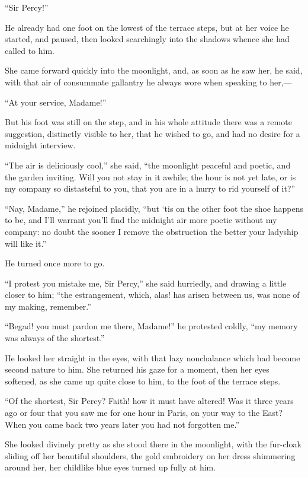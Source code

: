 \enquote{Sir Percy!}

He already had one foot on the lowest of the terrace steps, but at her voice he started, and paused, then looked searchingly into the shadows whence she had called to him.

She came forward quickly into the moonlight, and, as soon as he saw her, he said, with that air of consummate gallantry he always wore when speaking to her,---

\enquote{At your service, Madame!}

But his foot was still on the step, and in his whole attitude there was a remote suggestion, distinctly visible to her, that he wished to go, and had no desire for a midnight interview.

\enquote{The air is deliciously cool,} she said, \enquote{the moonlight peaceful and poetic, and the garden inviting. Will you not stay in it awhile; the hour is not yet late, or is my company so distasteful to you, that you are in a hurry to rid yourself of it?}

\enquote{Nay, Madame,} he rejoined placidly, \enquote{but `tis on the other foot the shoe happens to be, and I'll warrant you'll find the midnight air more poetic without my company: no doubt the sooner I remove the obstruction the better your ladyship will like it.}

He turned once more to go.

\enquote{I protest you mistake me, Sir Percy,} she said hurriedly, and drawing a little closer to him; \enquote{the estrangement, which, alas! has arisen between us, was none of my making, remember.}

\enquote{Begad! you must pardon me there, Madame!} he protested coldly, \enquote{my memory was always of the shortest.}

He looked her straight in the eyes, with that lazy nonchalance which had become second nature to him. She returned his gaze for a moment, then her eyes softened, as she came up quite close to him, to the foot of the terrace steps.

\enquote{Of the shortest, Sir Percy? Faith! how it must have altered! Was it three years ago or four that you saw me for one hour in Paris, on your way to the East? When you came back two years later you had not forgotten me.}

She looked divinely pretty as she stood there in the moonlight, with the fur-cloak sliding off her beautiful shoulders, the gold embroidery on her dress shimmering around her, her childlike blue eyes turned up fully at him.

